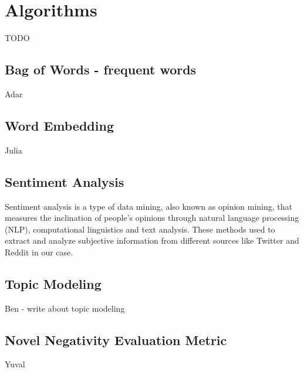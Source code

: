 \section{Algorithms}
TODO


\subsection{Bag of Words - frequent words}
Adar

\subsection{Word Embedding}
Julia

\subsection{Sentiment Analysis}
Sentiment analysis is a type of data mining, also known as opinion mining, 
that measures the inclination of people’s opinions through natural language processing (NLP), computational linguistics and text analysis. These methods used to extract and analyze subjective information from different sources like Twitter and Reddit in our case. 

\subsection{Topic Modeling}
Ben - write about topic modeling

\subsection{Novel Negativity Evaluation Metric}
Yuval 